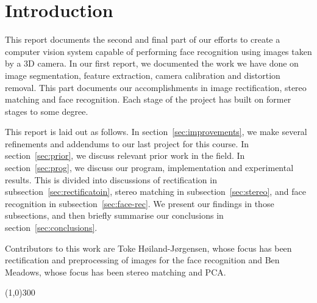 
\section{Introduction}
This report documents the second and final part of our efforts to create a computer vision
system capable of performing face recognition using images taken by a 3D camera. In our
first report, we documented the work we have done on image segmentation,
feature extraction, camera calibration and distortion removal. This part
documents our accomplishments in image rectification, stereo matching and face
recognition. Each stage of the project has built on former stages to some degree.

This report is laid out as follows. In section~\ref{sec:improvements}, we make
several refinements and addendums to our last project for this course. In
section~\ref{sec:prior}, we discuss relevant prior work in the field. In
section~\ref{sec:prog}, we discuss our program, implementation and experimental
results. This is divided into discussions of rectification in
subsection~\ref{sec:rectificatoin}, stereo matching in
subsection~\ref{sec:stereo}, and face recognition in
subsection~\ref{sec:face-rec}. We present our findings in those subsections, and
then briefly summarise our conclusions in section~\ref{sec:conclusions}.

Contributors to this work are Toke Høiland-Jørgensen, whose focus has been
rectification and preprocessing of images for the face recognition and
Ben Meadows, whose focus has been stereo matching and PCA.

\begin{center}
\line(1,0){300}
\end{center}
